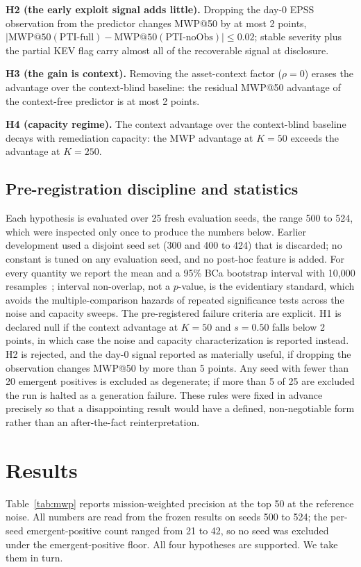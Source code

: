 \documentclass[journal]{IEEEtran}
\begin{document}
\textbf{H2 (the early exploit signal adds little).} Dropping the day-0 EPSS observation from the
predictor changes MWP@50 by at most 2 points, $|\mathrm{MWP@50(PTI\text{-}full)} -
\mathrm{MWP@50(PTI\text{-}noObs)}| \le 0.02$; stable severity plus the partial KEV flag carry almost
all of the recoverable signal at disclosure.

\textbf{H3 (the gain is context).} Removing the asset-context factor ($\rho = 0$) erases the
advantage over the context-blind baseline: the residual MWP@50 advantage of the context-free
predictor is at most 2 points.

\textbf{H4 (capacity regime).} The context advantage over the context-blind baseline decays with
remediation capacity: the MWP advantage at $K = 50$ exceeds the advantage at $K = 250$.

\subsection{Pre-registration discipline and statistics}
Each hypothesis is evaluated over 25 fresh evaluation seeds, the range 500 to 524, which were
inspected only once to produce the numbers below. Earlier development used a disjoint seed set (300
and 400 to 424) that is discarded; no constant is tuned on any evaluation seed, and no post-hoc
feature is added. For every quantity we report the mean and a 95\% BCa bootstrap interval with
10{,}000 resamples~\cite{efron1987bca,efron1994introduction}; interval non-overlap, not a
$p$-value, is the evidentiary standard, which avoids the multiple-comparison hazards of repeated
significance tests across the noise and capacity sweeps. The pre-registered failure criteria are
explicit. H1 is declared null if the context advantage at $K = 50$ and $s = 0.50$ falls below 2
points, in which case the noise and capacity characterization is reported instead. H2 is rejected,
and the day-0 signal reported as materially useful, if dropping the observation changes MWP@50 by
more than 5 points. Any seed with fewer than 20 emergent positives is excluded as degenerate; if more than 5 of 25
are excluded the run is halted as a generation failure. These rules were fixed in advance precisely
so that a disappointing result would have a defined, non-negotiable form rather than an
after-the-fact reinterpretation.

\section{Results}
Table~\ref{tab:mwp} reports mission-weighted precision at the top 50 at the reference noise. All
numbers are read from the frozen results on seeds 500 to 524; the per-seed emergent-positive count
ranged from 21 to 42, so no seed was excluded under the emergent-positive floor. All four hypotheses
are supported. We take them in turn.
\end{document}
